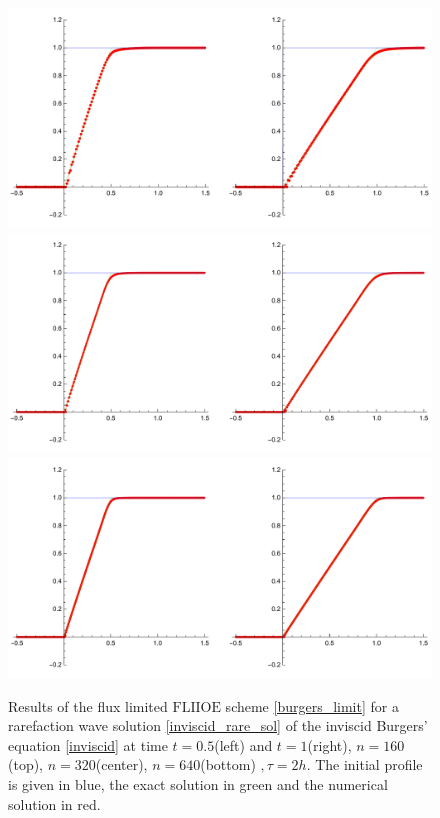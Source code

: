 \documentclass[../include.tex]{subfiles}
\begin{document}
\begin{figure}[H]
	\centering
	\includegraphics[width=.9\textwidth]{figures/inviscidRare_160_2h}
	\includegraphics[width=.9\textwidth]{figures/inviscidRare_320_2h}
	\includegraphics[width=.9\textwidth]{figures/inviscidRare_640_2h}
	\caption{Results of the flux limited $\mathrm{FLIIOE}$ scheme \eqref{burgers_limit} for a rarefaction wave solution \eqref{inviscid_rare_sol} of the inviscid Burgers' equation \eqref{inviscid} at time $ t=0.5 $(left) and $ t=1 $(right), $ n=160 $(top), $ n = 320 $(center), $ n = 640 $(bottom) $, \tau=2h $. The initial profile is given in blue, the exact solution in green and the numerical solution in red.}
	\label{fig:fliioe_shock_rare_2h}
\end{figure}
\end{document}
